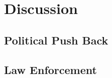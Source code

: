 \section{Discussion}
\label{sec:discussion}

\subsection{Political Push Back}

\subsection{Law Enforcement}
